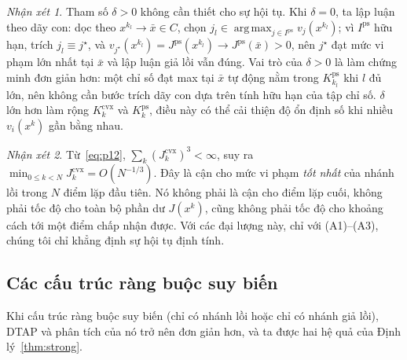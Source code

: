 \documentclass[]{interact}
\theoremstyle{plain}
\theoremstyle{definition}
\theoremstyle{remark}
\newtheorem{remark}{Nhận xét}
\DeclareMathOperator*{\argmax}{arg\,max}
\newcommand{\cvx}{\mathrm{cvx}}
\newcommand{\ps}{\mathrm{ps}}
\newcommand{\dtap}{\textsc{DTAP}}
\begin{document}
\begin{remark}\label{rem:delta-role}
Tham số $\delta>0$ không cần thiết cho sự hội tụ. Khi $\delta=0$, ta lập luận theo
dãy con: dọc theo $x^{k_l}\to\bar x\in C$, chọn
$j_l\in\argmax_{j\in I^{\ps}}v_j(x^{k_l})$; vì $I^{\ps}$ hữu hạn, trích
$j_l\equiv j^\star$, và $v_{j^\star}(x^{k_l})=J^{\ps}(x^{k_l})\to J^{\ps}(\bar x)>0$, nên
$j^\star$ đạt mức vi phạm lớn nhất tại $\bar x$ và lập luận giả lồi
vẫn đúng. Vai trò của $\delta>0$ là làm chứng minh đơn giản hơn: một chỉ số đạt max tại $\bar x$ tự động
nằm trong $K^{\ps}_{k_l}$ khi $l$ đủ lớn, nên không cần bước trích dãy con dựa trên tính hữu hạn của tập chỉ số.
$\delta$ lớn hơn làm rộng $K^{\cvx}_k$ và $K^{\ps}_k$, điều này có thể cải thiện độ ổn định
số khi nhiều $v_i(x^k)$ gần bằng nhau.
\end{remark}

\begin{remark}\label{rem:rate}
Từ~\eqref{eq:p12}, $\sum_k(J^{\cvx}_k)^3<\infty$, suy ra
$\min_{0\le k<N}J^{\cvx}_k=O(N^{-1/3})$. Đây là cận cho mức vi phạm \emph{tốt nhất} của nhánh lồi
trong $N$ điểm lặp đầu tiên. Nó không phải là cận cho điểm lặp cuối, không phải tốc độ cho toàn bộ phần dư
$J(x^k)$, cũng không phải tốc độ cho khoảng cách tới một điểm chấp nhận được. Với các đại lượng này,
chỉ với (A1)--(A3), chúng tôi chỉ khẳng định sự hội tụ định tính.
\end{remark}

\subsection{Các cấu trúc ràng buộc suy biến}\label{ssec:degenerate}
Khi cấu trúc ràng buộc suy biến (chỉ có nhánh lồi hoặc chỉ có nhánh giả lồi),
\dtap{} và phân tích của nó trở nên đơn giản hơn, và ta được hai hệ quả của
Định lý~\ref{thm:strong}.
\end{document}
